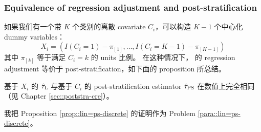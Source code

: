  \subsubsection{Equivalence of regression adjustment and post-stratification}
如果我们有一个带 $K$ 个类别的离散 covariate $C_i$，可以构造 $K-1$ 个中心化 dummy variables：
$$
X_i = ( I(C_i=1) - \pi_{[1]}, \ldots,   I(C_i=K-1) - \pi_{[K-1]})
$$ 
其中 $\pi_{[k]}$ 等于满足 $C_i = k$ 的 units 比例。
在这种情况下，\citet{lin2013} 的 regression adjustment 等价于 post-stratification，如下面的 proposition 所总结。

\begin{proposition}
\label{prop::lin=ps-discrete}
基于 $X_i$ 的 $\hat{\tau}_\textsc{L}$ 与基于 $C_i$ 的 post-stratification estimator $\hat{\tau}_\textsc{PS}$ 在数值上完全相同（见 Chapter \ref{sec::poststra-cre}）。
\end{proposition}

我把 Proposition \ref{prop::lin=ps-discrete} 的证明作为 Problem \ref{para::lin=ps-discrete}。

